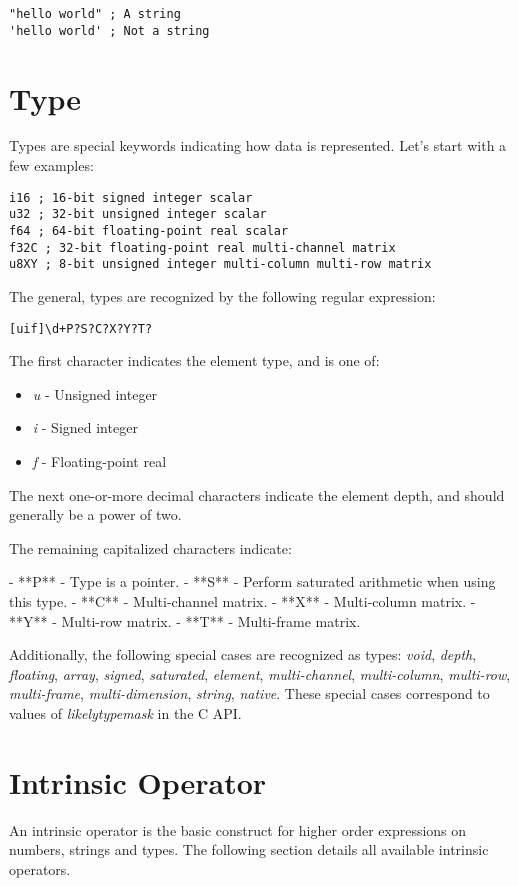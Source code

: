 \documentclass[numbers=noenddot]{scrbook}
\begin{document}
\begin{verbatim}
"hello world" ; A string
'hello world' ; Not a string
\end{verbatim}

\section{Type}
Types are special keywords indicating how data is represented.
Let's start with a few examples:

\begin{verbatim}
i16 ; 16-bit signed integer scalar
u32 ; 32-bit unsigned integer scalar
f64 ; 64-bit floating-point real scalar
f32C ; 32-bit floating-point real multi-channel matrix
u8XY ; 8-bit unsigned integer multi-column multi-row matrix
\end{verbatim}

The general, types are recognized by the following regular expression:

\begin{verbatim}
[uif]\d+P?S?C?X?Y?T?
\end{verbatim}

The first character indicates the element type, and is one of:

\begin{itemize}
\item \emph{u} - Unsigned integer
\item \emph{i} - Signed integer
\item \emph{f} - Floating-point real
\end{itemize}

The next one-or-more decimal characters indicate the element depth, and should generally be a power of two.

The remaining capitalized characters indicate:

- **P** - Type is a pointer.
- **S** - Perform saturated arithmetic when using this type.
- **C** - Multi-channel matrix.
- **X** - Multi-column matrix.
- **Y** - Multi-row matrix.
- **T** - Multi-frame matrix.

Additionally, the following special cases are recognized as types: \emph{void}, \emph{depth}, \emph{floating}, \emph{array}, \emph{signed}, \emph{saturated}, \emph{element}, \emph{multi-channel}, \emph{multi-column}, \emph{multi-row}, \emph{multi-frame}, \emph{multi-dimension}, \emph{string}, \emph{native}.
These special cases correspond to values of \emph{likely\emph{type}mask} in the C API.

\section{Intrinsic Operator}
An intrinsic operator is the basic construct for higher order expressions on numbers, strings and types.
The following section details all available intrinsic operators.
\end{document}
